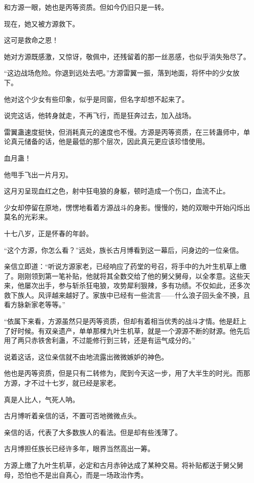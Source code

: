 \begin{this_body}
和方源一眼，她也是丙等资质。但如今仍旧只是一转。

现在，她又被方源救下。

这可是救命之恩！

她对方源既感激，又惊讶，敬佩中，还残留着的那一丝恶感，也似乎消失殆尽了。

“这边战场危险。你退到远处去吧。”方源雷翼一振，落到地面，将怀中的少女放下。

他对这个少女有些印象，似乎是同窗，但名字却想不起来了。

说完这话，他转身就走，不再飞行，而是狂奔过去，加入战场。

雷翼蛊速度挺快，但消耗真元的速度也不慢。方源是丙等资质，在三转蛊师中，单论真元储备的话，他是最低的那个层次，因此真元更应该珍惜使用。

血月蛊！

他甩手飞出一片月刃。

这月刃呈现血红之色，射中狂电狼的身躯，顿时造成一个伤口，血流不止。

少女却停留在原地，愣愣地看着方源战斗的身影。慢慢的，她的双眼中开始闪烁出莫名的光彩来。

十七八岁，正是怀春的年龄。

“这个方源，你怎么看？”远处，族长古月博看到这一幕后，问身边的一位亲信。

亲信立即道：“听说方源家老，已经响应了药堂的号召，将手中的九叶生机草上缴了。刚刚领到第一笔补贴，他就将其全数交给了他的舅父舅母，以全孝意。这些天来，他屡次出手，参与斩杀狂电狼，攻势犀利狠辣，多有功绩。不仅如此，还多次救下族人。风评越来越好了。家族中已经有一些流言——什么浪子回头金不换，且看方脉新家老等等。”

“依属下来看，方源虽然只是丙等资质，但却有着相当优秀的战斗才情。他是赶上了好时候。有双亲遗产，单单那棵九叶生机草，就是一个源源不断的财源。他先后用了两只赤铁舍利蛊，不过能修行到三转，还是有运气成分的。”

说着这话，这位亲信就不由地流露出微微嫉妒的神色。

他也是丙等资质，但是只有二转修为，爬到今天这一步，用了大半生的时光。而那方源，才不过十七岁，就已经是家老。

真是人比人，气死人呐。

古月博听着亲信的话，不置可否地微微点头。

亲信的话，代表了大多数族人的看法。但是却有些浅薄了。

古月博担任族长已经许多年，眼界当然高出一筹。

方源上缴了九叶生机草，必定和古月赤钟达成了某种交易。将补贴都送于舅父舅母，恐怕也不是出自真心，而是一场政治作秀。


\end{this_body}
